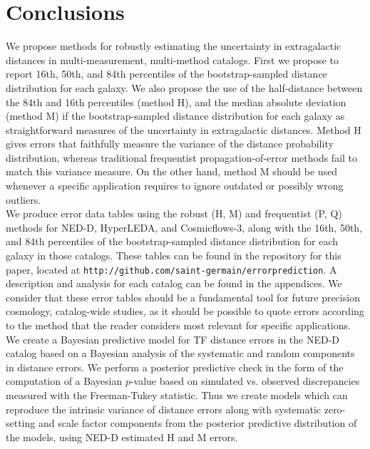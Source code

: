 \documentclass[a4paper,fleqn,usenatbib]{mnras}
\begin{document}
\section{Conclusions}

We propose methods for robustly estimating the uncertainty in extragalactic distances in multi-measurement, multi-method catalogs. First we propose to report 16th, 50th, and 84th percentiles of the bootstrap-sampled distance distribution for each galaxy. We also propose the use of the half-distance between the 84th and 16th percentiles (method H), and the median absolute deviation (method M) if the bootstrap-sampled distance distribution for each galaxy as straightforward measures of the uncertainty in extragalactic distances. Method H gives errors that faithfully measure the variance of the distance probability distribution, whereas traditional frequentist propagation-of-error methods fail to match this variance measure. On the other hand, method M should be used whenever a specific application requires to ignore outdated or possibly wrong outliers.\\

We produce error data tables using the robust (H, M) and frequentist (P, Q) methods for NED-D, HyperLEDA, and Cosmicflows-3, along with the 16th, 50th, and 84th percentiles of the bootstrap-sampled distance distribution for each galaxy in those catalogs. These tables can be found in the repository for this paper, located at \texttt{http://github.com/saint-germain/errorprediction}. A description and analysis for each catalog can be found in the appendices. We consider that these error tables should be a fundamental tool for future precision cosmology, catalog-wide studies, as it should be possible to quote errors according to the method that the reader considers most relevant for specific applications.\\

We create a Bayesian predictive model for TF distance errors in the NED-D catalog based on a Bayesian analysis of the systematic and random components in distance errors. We perform a posterior predictive check in the form of the computation of a Bayesian $p$-value based on simulated vs. observed discrepancies measured with the Freeman-Tukey statistic. Thus we create models which can reproduce the intrinsic variance of distance errors along with systematic zero-setting and scale factor components from the posterior predictive distribution of the models, using NED-D estimated H and M errors.\\
\end{document}
